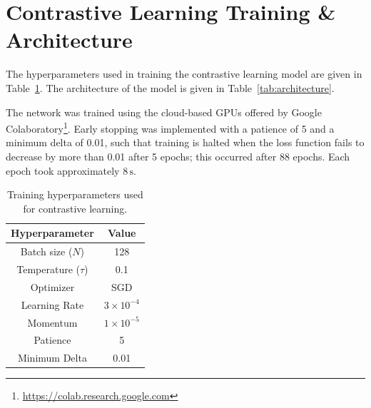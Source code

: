 \documentclass[fleqn,usenatbib]{mnras}
\begin{document}
\section{Contrastive Learning Training \& Architecture} \label{app_contrastive}

The hyperparameters used in training the contrastive learning model are given in Table~\ref{tab:hyperparameters}.
The architecture of the model is given in Table~\ref{tab:architecture}.

The network was trained using the cloud-based GPUs offered by Google Colaboratory\footnote{
\url{https://colab.research.google.com}
}.
Early stopping was implemented with a patience of 5 and a minimum delta of 0.01, such that training is halted when the loss function fails to decrease by more than 0.01 after 5 epochs;
this occurred after 88 epochs.
Each epoch took approximately $8\,\text{s}$.

\begin{table}
	\centering
	\caption{Training hyperparameters used for contrastive learning.}
	\label{tab:hyperparameters}
	\begin{tabular}{cc} %
		\hline
        Hyperparameter & Value\\
        \hline
        Batch size ($N$) & 128\\
		Temperature ($\tau$) & 0.1\\
        Optimizer & SGD\\
        Learning Rate & $3\times10^{-4}$\\
        Momentum & $1\times10^{-5}$\\
        Patience & 5\\
        Minimum Delta & 0.01\\
		\hline
	\end{tabular}
\end{table}
\end{document}
